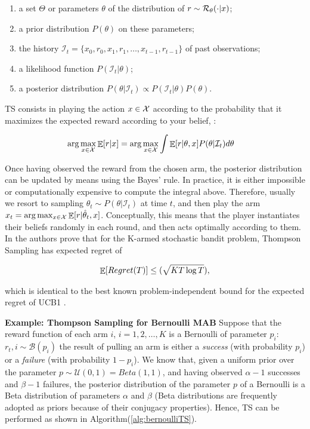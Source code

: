 \begin{enumerate}
\item a set $\Theta$ or parameters $\theta$ of the distribution of $r\sim\mathcal{R}_{\theta}(\cdot|x)$;
\item a prior distribution $P(\theta)$ on these parameters;
\item the history $\mathcal{I}_t = \{x_0, r_0, x_1, r_1, \dots, x_{t-1}, r_{t-1}\}$ of past observations;
\item a likelihood function $P(\mathcal{I}_t|\theta)$;
\item a posterior distribution $P(\theta|\mathcal{I}_t)\propto P(\mathcal{I}_t|\theta)P(\theta)$.
\end{enumerate}

\gls{TS} consists in playing the action $x\in\mathcal{X}$ according to the probability that it maximizes the expected reward according to your belief, \ie:

\begin{align}
\arg\max_{x\in\mathcal{X}}\mathop{\mathbb{E}}[r|x] &= \arg\max_{x\in\mathcal{X}}\int\mathop{\mathbb{E}}[r|\theta,x]P(\theta|\mathcal{I}_t)d\theta
\end{align}

Once having observed the reward from the chosen arm, the posterior distribution can be updated by means using the Bayes' rule. In practice, it is either impossible or computationally expensive to compute the integral above. Therefore, usually we resort to sampling $\hat{\theta}_t\sim P(\theta|\mathcal{I}_t)$ at time $t$, and then play the arm $x_t=\arg\max_{x\in\mathcal{X}} \mathop{\mathbb{E}}[r|\hat{\theta}_t,x]$.  Conceptually, this means that the player instantiates their beliefs randomly in each round, and then acts optimally according to them.  \\
In \cite{agrawal2013further} the authors prove that for the K-armed stochastic bandit problem, Thompson Sampling has expected regret of

\begin{align}
\mathop{\mathbb{E}}[Regret(T)]\leq\mathcal(\sqrt{KT\log T}),
\end{align}

which is identical to the best known problem-independent bound for the expected regret of UCB1 \cite{bubeck2012regret}.

\textbf{Example: Thompson Sampling for Bernoulli MAB}
Suppose that the reward function of each arm $i$, $i=1,2,\dots,K$ is a Bernoulli of parameter $p_i$: $r_t,i\sim\mathcal{B}(p_i)$ \ie the result of pulling an arm is either a \emph{success} (with probability $p_i$) or a \emph{failure} (with probability $1-p_i$). We know that, given a uniform prior over the parameter $p\sim\mathcal{U}(0,1)=Beta(1,1)$, and having observed $\alpha-1$ successes and $\beta-1$ failures, the posterior distribution of the parameter $p$ of a Bernoulli is a Beta distribution of parameters $\alpha$ and $\beta$ (Beta distributions are frequently adopted as priors because of their conjugacy properties). Hence, \gls{TS} can be performed as shown in Algorithm(\ref{alg:bernoulliTS}).

